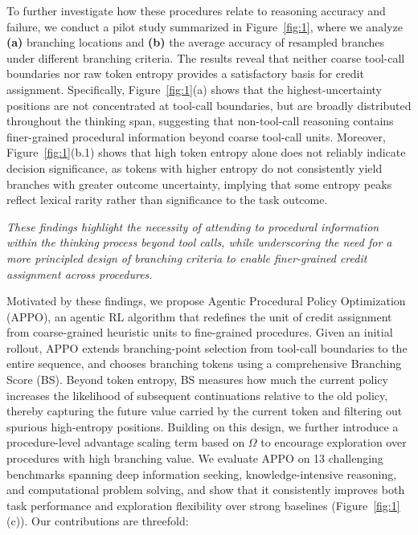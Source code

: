 \documentclass{llmxive}
\begin{document}
To further investigate how these procedures relate to reasoning accuracy and failure, we conduct a pilot study summarized in Figure~\ref{fig:1}, where we analyze \textbf{(a)} branching locations and \textbf{(b)} the average accuracy of resampled branches under different branching criteria. The results reveal that neither coarse tool-call boundaries nor raw token entropy provides a satisfactory basis for credit assignment. Specifically, Figure~\ref{fig:1}(a) shows that the highest-uncertainty positions are not concentrated at tool-call boundaries, but are broadly distributed throughout the thinking span, suggesting that non-tool-call reasoning contains finer-grained procedural information beyond coarse tool-call units. Moreover, Figure~\ref{fig:1}(b.1) shows that high token entropy alone does not reliably indicate decision significance, as tokens with higher entropy do not consistently yield branches with greater outcome uncertainty, implying that some entropy peaks reflect lexical rarity rather than significance to the task outcome. 

 \begin{tcolorbox}[
  colback=gray!10,     
  colframe=black,      
  boxrule=1pt,        
  arc=2mm,           
  left=4pt,right=4pt,top=4pt,bottom=4pt, 
]
 \textit{These findings highlight the necessity of attending to procedural information within the thinking process beyond tool calls, while underscoring the need for a more principled design of branching criteria to enable finer-grained credit assignment across procedures.}
\end{tcolorbox}


Motivated by these findings, we propose Agentic Procedural Policy Optimization (APPO), an agentic RL algorithm that redefines the unit of credit assignment from coarse-grained heuristic units to fine-grained procedures. Given an initial rollout, APPO extends branching-point selection from tool-call boundaries to the entire sequence, and chooses branching tokens using a comprehensive Branching Score (BS). Beyond token entropy, BS measures how much the current policy increases the likelihood of subsequent continuations relative to the old policy, thereby capturing the future value carried by the current token and filtering out spurious high-entropy positions. Building on this design, we further introduce a procedure-level advantage scaling term based on $\Omega$ to encourage exploration over procedures with high branching value. We evaluate APPO on 13 challenging benchmarks spanning deep information seeking, knowledge-intensive reasoning, and computational problem solving, and show that it consistently improves both task performance and exploration flexibility over strong baselines (Figure~\ref{fig:1}(c)). Our contributions are threefold:  
\end{document}
